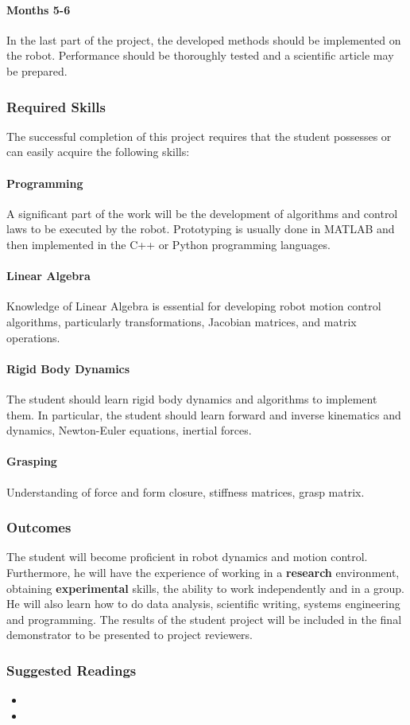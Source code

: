 \paragraph{Months 5-6}
In the last part of the project, the developed methods should be implemented on the robot. Performance should be thoroughly tested and a scientific article may be prepared.
\subsubsection{Required Skills}
The successful completion of this project requires that the student possesses or can easily acquire the following skills: 
\paragraph{Programming} A significant part of the work will be the development of algorithms and control laws to be executed by the robot. Prototyping is usually done in MATLAB and then implemented in the C++ or Python programming languages.
\paragraph{Linear Algebra} Knowledge of Linear Algebra is essential for developing robot motion control algorithms, particularly  transformations, Jacobian matrices, and matrix operations.
\paragraph{Rigid Body Dynamics} 
The student should learn rigid body dynamics and algorithms to implement them.
In particular, the student should learn forward and inverse kinematics and dynamics, Newton-Euler equations, inertial forces.
\paragraph{Grasping} 
Understanding of force and form closure, stiffness matrices, grasp matrix.

\subsubsection{Outcomes}
The student will become proficient in robot dynamics and motion control. 
Furthermore, he will have the experience of working in a \textbf{research} environment, obtaining \textbf{experimental} skills, the ability to work independently and in a group. He will also learn how to do data analysis, scientific writing, systems engineering and programming.
The results of the student project will be included in the final demonstrator to be presented to project reviewers.

\subsubsection{Suggested Readings}
\begin{itemize}
	\item {}
	\item {}
\end{itemize}
